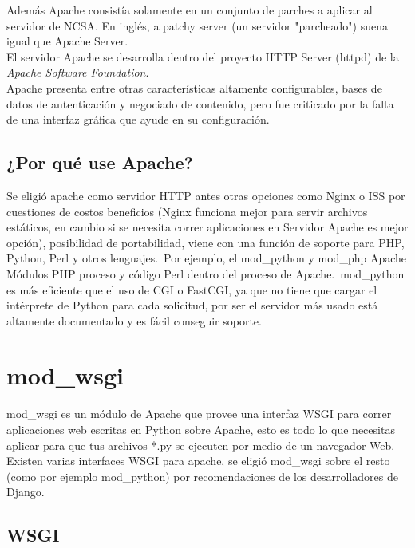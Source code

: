 Además Apache consistía solamente en un conjunto de parches a aplicar al servidor de NCSA. En inglés, a patchy server (un servidor "parcheado") suena igual que  Apache Server. \\[0.1cm]

El servidor Apache se desarrolla dentro del proyecto HTTP Server (httpd) de la \textit{Apache Software Foundation}.\\[0.1cm]

Apache presenta entre otras características altamente configurables, bases de datos de autenticación y negociado de contenido, pero fue criticado por la falta de una interfaz gráfica que ayude en su configuración.\\[0.2cm]

\subsection{¿Por qué use Apache?}

Se eligió apache como servidor HTTP antes otras opciones como Nginx o ISS por cuestiones de costos beneficios
 (Nginx funciona mejor para servir archivos estáticos, en cambio si se necesita correr aplicaciones en Servidor Apache es mejor opción),
 posibilidad de portabilidad, viene con una función de soporte para PHP, Python, Perl y otros lenguajes. Por ejemplo, el mod\_python y mod\_php Apache Módulos
  PHP proceso y código Perl dentro del proceso de Apache. mod\_python es más eficiente que el uso de CGI o FastCGI, ya que no tiene que cargar el intérprete de
  Python para cada solicitud, por ser el servidor más usado está altamente documentado y es fácil conseguir soporte. 


\section{mod\_wsgi}

mod\_wsgi es un módulo de Apache que provee una interfaz WSGI para correr aplicaciones web escritas en Python sobre Apache, esto es todo lo que necesitas aplicar para que tus  archivos *.py se ejecuten por medio de un navegador Web.\\[0.1cm]
 
Existen varias interfaces WSGI para apache, se eligió mod\_wsgi sobre el resto (como por ejemplo mod\_python) por recomendaciones de los desarrolladores de Django.


\subsection{WSGI}

